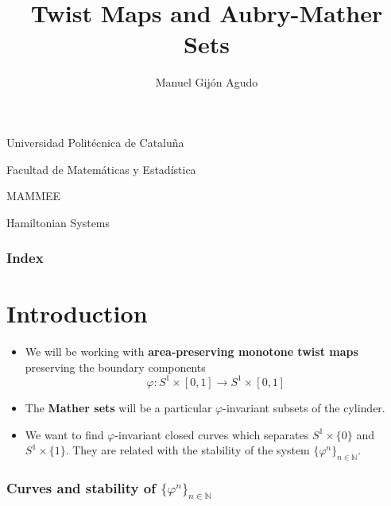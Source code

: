 \documentclass[12 pt]{beamer}
\title{Twist Maps and Aubry-Mather Sets}
\author{\normalsize{Manuel Gijón Agudo}}
\date{}
\begin{document}
\begin{frame}
    \begin{center}

        Universidad Politécnica de Cataluña
        
        Facultad de Matemáticas y Estadística
        
        MAMMEE
        
        \scriptsize{Hamiltonian Systems}
        
        \maketitle    
        
        \small{}
    \end{center}
  
\end{frame}


\begin{frame}{0}
    \frametitle{Index}     
    \tableofcontents
\end{frame}


\section{Introduction}

\begin{frame}{1}
   
  	\begin{itemize}
  		\item We will be working with \textbf{area-preserving monotone twist maps} preserving the boundary components
			$$
				\varphi: S^{1} \times [0, 1] \longrightarrow S^{1} \times [0, 1]
			$$
		\item The \textbf{Mather sets} will be a particular $\varphi$-invariant subsets of the cylinder.
		\item We want to find $\varphi$-invariant closed curves which separates $S^{1} \times \{ 0 \}$ and $S^{1} \times \{ 1 \}$. They are related with the stability of the system $\{ \varphi^{n} \}_{n \in \mathbb{N}}$.	
  	\end{itemize}

\end{frame}

\begin{frame}{2}
    \frametitle{Curves and stability of $\{ \varphi^{n} \}_{n \in \mathbb{N}}$}
   
\end{frame}
\end{document}
